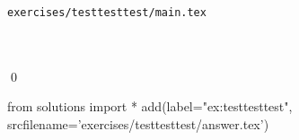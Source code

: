 \verb!exercises/testtesttest/main.tex!

\begin{ex}
  \label{ex:testtesttest}
  
  \mbox{}\\ \\
  \qed
\end{ex}
\begin{python0}
from solutions import *
add(label="ex:testtesttest",
    srcfilename='exercises/testtesttest/answer.tex') 
\end{python0}                              
